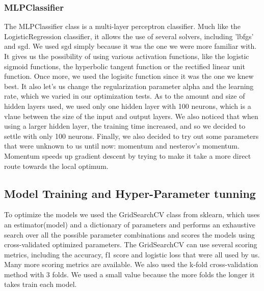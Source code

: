 \documentclass[12pt]{article}
\begin{document}
\subsubsection{MLPClassifier}
\label{subsubsection.mlpc}
    \par 
        The MLPClassifier\cite{MLPClassifier} class is a multi-layer perceptron classifier. Much like the LogisticRegression classifier, it allows the use of several 
        solvers, including 'lbfgs' and \ac{sgd}. We used \ac{sgd} simply because it was the one we were more familiar with. It gives us the possibility 
        of using various activation functions, like the logistic sigmoid functions, the hyperbolic tangent function or the rectified linear unit function. Once 
        more, we used the logisitc function since it was the one we knew best. It also let's us change the regularization parameter alpha and the learning rate, 
        which we varied in our optimization tests. As to the amount and size of hidden layers used, we used only one hidden layer\cite{nn_faq} with 100 neurons, 
        which is a vlaue between the size of the input and output layers. We also noticed that when using a larger hidden layer, the training time increased, 
        and so we decided to settle with only 100 neurons. Finally, we also decided 
        to try out some parameters that were unknown to us until now: momentum and nesterov's momentum. Momentum speeds up gradient descent by trying to make it 
        take a more direct route towards the local optimum.

\subsection{Model Training and Hyper-Parameter tunning}
\label{subsection.model_tunning}
To optimize the models we used the GridSearchCV\cite{grid_search} class from sklearn, which uses an estimator(model) and a dictionary of parameters and 
performs an exhaustive search over all the possible parameter combinations and scores the models using cross-validated optimized parameters. The GridSearchCV 
can use several scoring metrics, including the accuracy, f1 score and logistic loss that were all used by us. Many more scoring metrics 
are available\cite{metrics}. We also used the k-fold cross-validation method with 3 folds\cite{cv}. We used a small value because the more folds the longer it 
takes train each model.
\end{document}
